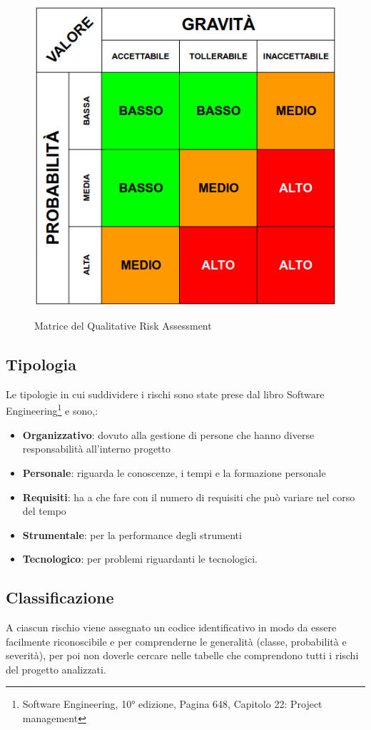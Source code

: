 	\begin{figure}[H]
		\centering
		\includegraphics[scale=0.5]{img/risk_assessment_table.png}\\
		\caption{Matrice del Qualitative Risk Assessment}
	\end{figure}
	\subsection{Tipologia}
	Le tipologie in cui suddividere i rischi sono state prese dal libro Software Engineering\footnote{Software Engineering, 10° edizione, Pagina 648, Capitolo 22: Project management} e sono,:
	\begin{itemize}
 		\item \textbf{Organizzativo}: dovuto alla gestione di persone che hanno diverse responsabilità all'interno progetto
		\item \textbf{Personale}: riguarda le conoscenze, i tempi e la formazione personale
		\item \textbf{Requisiti}: ha a che fare con il numero di requisiti che può variare nel corso del tempo
		\item \textbf{Strumentale}: per la performance degli strumenti
		\item \textbf{Tecnologico}: per problemi riguardanti le tecnologici.
	\end{itemize}
	\subsection{Classificazione}
	A ciascun rischio viene assegnato un codice identificativo in modo da essere facilmente riconoscibile e per comprenderne le generalità (classe, probabilità e severità), per poi non doverle cercare nelle tabelle che comprendono tutti i rischi del progetto analizzati.
	
